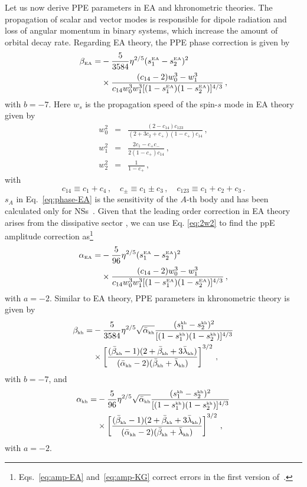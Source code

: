 \documentclass[prd,twocolumn,nofootinbib]{revtex4-1}
\newcommand\be{\begin{equation}}
\newcommand\ba{\begin{eqnarray}}
\newcommand\ee{\end{equation}}
\newcommand\ea{\end{eqnarray}}
\newcommand{\KG}{{\mbox{\tiny kh}}}
\newcommand{\EA}{{\mbox{\tiny EA}}}
\begin{document}
 

Let us now derive PPE parameters in EA and khronometric theories. The propagation of scalar and vector modes is responsible for dipole radiation and loss of angular momentum in binary systems, which increase the amount of orbital decay rate. 
Regarding EA theory, the PPE phase correction is given by \cite{Hansen:2014ewa} 
 \begin{align}
 \label{eq:phase-EA}
 \beta_{\EA}=&-\frac{5}{3584}\eta ^{2/5} (s_1^\EA-s_2^\EA)^2\nonumber\\
 & \times \frac{(c_{14}-2) w_0^3-w_1^3}{c_{14} w_0^3 w_1^3 [(1-s_1^\EA) (1-s_2^\EA)]^{4/3}}\,,
 \end{align}
with $b=-7$. Here $w_s$ is the propagation speed of the spin-$s$ mode in EA theory given by~\cite{Jacobson:2008aj}  
\ba
w_0^2 &=& \frac{(2-c_{14}) c_{123}}{(2+3c_2+c_{+}) (1-c_{+}) c_{14}}\,, \\
w_1^2 &=& \frac{2 c_1 - c_{+} c_{-}}{2(1-c_{+}) c_{14}}\,, \\
w_2^2 &=& \frac{1}{1 - c_+}\,,
\ea
with
\be
c_{14}\equiv c_1+c_4\,, \quad c_{\pm} \equiv c_1 \pm c_3\,, \quad c_{123} \equiv c_1 + c_2 + c_3\,. 
\ee
$s_A$ in Eq.~\eqref{eq:phase-EA} is the sensitivity of the $A$-th body and has been calculated only for NSs~\cite{Yagi:2013ava,Yagi:2013qpa}.
Given that the leading order correction in EA theory arises from the dissipative sector \cite{Hansen:2014ewa}, we can use Eq. \eqref{eq:2w2} to find the ppE amplitude correction as\footnote{Eqs.~\eqref{eq:amp-EA} and~\eqref{eq:amp-KG} correct errors in the first version of~\cite{Hansen:2014ewa}.}
 \begin{align}
 \label{eq:amp-EA}
 \alpha_{\EA}=&-\frac{5}{96}\eta ^{2/5} (s_1^\EA-s_2^\EA)^2 \nonumber\\
 & \times  \frac{(c_{14}-2) w_0^3-w_1^3}{c_{14} w_0^3 w_1^3 [ (1-s_1^\EA) (1-s_2^\EA)]^{4/3}}\,,
 \end{align}
 with $a=-2$.  Similar to EA theory, PPE parameters in khronometric theory is given by \cite{Hansen:2014ewa}
 \begin{align}
 \beta_{\KG}=&-\frac{5}{3584}\eta ^{2/5}\sqrt{\bar \alpha_{\KG}}\frac{(s_1^\KG-s_2^\KG)^2}{[(1-s_1^\KG) (1-s_2^\KG)]^{4/3}} \nonumber\\
 & \times \left[\frac{(\bar \beta_{\KG}-1)(2+\bar \beta_{\KG}+3\bar \lambda_{\KG})}{(\bar \alpha_{\KG}-2)(\bar \beta_{\KG}+\bar \lambda_{\KG})}\right]^{3/2}\,,
 \end{align}
 with $b=-7$, and
 \begin{align}
 \label{eq:amp-KG}
 \alpha_{\KG}=&-\frac{5}{96} \eta ^{2/5}\sqrt{\bar \alpha_{\KG}}\frac{(s_1^\KG-s_2^\KG)^2}{[(1-s_1^\KG) (1-s_2^\KG)]^{4/3}} \nonumber\\
 & \times \left[\frac{(\bar \beta_{\KG}-1)(2+\bar \beta_{\KG}+3\bar \lambda_{\KG})}{(\bar \alpha_{\KG}-2)(\bar \beta_{\KG}+\bar \lambda_{\KG})}\right]^{3/2}\,,
 \end{align}
 with $a=-2$.
 
\end{document}
